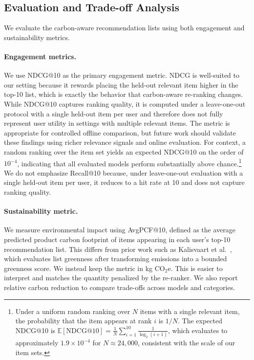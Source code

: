 \documentclass[11pt]{article}
\begin{document}
\subsection{Evaluation and Trade-off Analysis}

We evaluate the carbon-aware recommendation lists using both engagement and sustainability
metrics.

\paragraph{Engagement metrics.}
We use NDCG@10 as the primary engagement metric. NDCG is well-suited to our setting
because it rewards placing the held-out relevant item higher in the top-10 list, which is
exactly the behavior that carbon-aware re-ranking changes. While NDCG@10 captures ranking quality, it is computed under a leave-one-out
protocol with a single held-out item per user and therefore does not fully
represent user utility in settings with multiple relevant items. The metric is
appropriate for controlled offline comparison, but future work should validate
these findings using richer relevance signals and online evaluation. For context, a random ranking
over the item set yields an expected NDCG@10 on the order of $10^{-4}$, indicating that all
evaluated models perform substantially above chance.\footnote{Under a uniform random ranking over $N$ items with a single relevant item,
the probability that the item appears at rank $i$ is $1/N$. The expected NDCG@10 is
$\mathbb{E}[\mathrm{NDCG@10}] = \frac{1}{N} \sum_{i=1}^{10} \frac{1}{\log_2(i+1)}$,
which evaluates to approximately $1.9 \times 10^{-4}$ for $N \approx 24{,}000$,
consistent with the scale of our item sets.}
We do not emphasize Recall@10 because, under leave-one-out evaluation with a single
held-out item per user, it reduces to a hit rate at 10 and does not capture ranking quality.
\paragraph{Sustainability metric.}
We measure environmental impact using AvgPCF@10, defined as the average predicted product
carbon footprint of items appearing in each user's top-10 recommendation list.
This differs from prior work such as Kalisvaart et al.~\cite{kalisvaart2025greenerrec},
which evaluates list greenness after transforming emissions into a bounded greenness
score. We instead keep the metric in kg CO$_2$e. This is easier to interpret and matches
the quantity penalized by the re-ranker. We also report relative carbon reduction to
compare trade-offs across models and categories.
\end{document}
